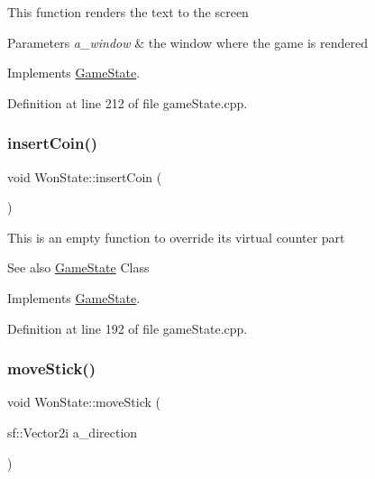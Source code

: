 This function renders the text to the screen


\begin{DoxyParams}{Parameters}
{\em a\+\_\+window} & the window where the game is rendered \\
\hline
\end{DoxyParams}


Implements \hyperlink{class_game_state_a5ffd5ce9acb7499ddef613e8836d1ef8}{Game\+State}.



Definition at line 212 of file game\+State.\+cpp.

\mbox{\label{class_won_state_aeaab03fa1a39188c19107047417c65b6}} 
\subsubsection{\texorpdfstring{insert\+Coin()}{insertCoin()}}
{\footnotesize\ttfamily void Won\+State\+::insert\+Coin (\begin{DoxyParamCaption}{ }\end{DoxyParamCaption})\hspace{0.3cm}{\ttfamily [virtual]}}

This is an empty function to override it\textquotesingle{}s virtual counter part \begin{DoxySeeAlso}{See also}
\hyperlink{class_game_state}{Game\+State} Class 
\end{DoxySeeAlso}


Implements \hyperlink{class_game_state_a4cd6f5b4ad23fc08dca287df26d94b94}{Game\+State}.



Definition at line 192 of file game\+State.\+cpp.

\mbox{\label{class_won_state_a56b272d25511e6a302136d308648464b}} 
\subsubsection{\texorpdfstring{move\+Stick()}{moveStick()}}
{\footnotesize\ttfamily void Won\+State\+::move\+Stick (\begin{DoxyParamCaption}\item[{sf\+::\+Vector2i}]{a\+\_\+direction }\end{DoxyParamCaption})\hspace{0.3cm}{\ttfamily [virtual]}}

